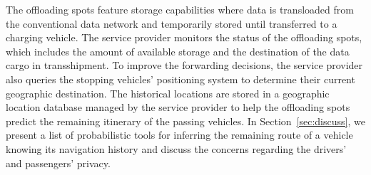 
The offloading spots feature storage capabilities where data is transloaded from the conventional data network and temporarily stored 
until transferred to a charging vehicle. 
The service provider monitors the status of the offloading spots, which includes the amount of available storage and the destination of the data cargo in transshipment. To improve the forwarding decisions, the service provider also queries the stopping vehicles' positioning system to determine their current geographic destination. The historical locations are stored in a geographic location database managed by the service provider to help the offloading spots predict the remaining itinerary of the passing vehicles.  In Section~\ref{sec:discuss}, we present a list of probabilistic tools for inferring the remaining route of a vehicle knowing its navigation history and discuss the concerns regarding the drivers' and passengers' privacy.


